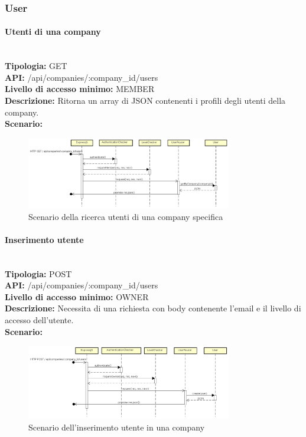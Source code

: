 \newpage
\subsubsection{User}
\paragraph{Utenti di una company}\mbox{}\\
\textbf{Tipologia:} GET \\
\textbf{API:} /api/companies/:company\_id/users \\
\textbf{Livello di accesso minimo:} MEMBER \\
\textbf{Descrizione:} Ritorna un array di JSON contenenti i profili degli utenti della company. \\
\textbf{Scenario:} 
\begin{figure}[H]
\centering
\includegraphics[width=0.8\textwidth]{res/sections/backend/sequence/(GET)user.png}
\caption{Scenario della ricerca utenti di una company specifica}
\end{figure}

\newpage
\paragraph{Inserimento utente}\mbox{}\\
\textbf{Tipologia:} POST \\
\textbf{API:} /api/companies/:company\_id/users \\
\textbf{Livello di accesso minimo:} OWNER \\
\textbf{Descrizione:} Necessita di una richiesta con body contenente l'email e il livello di accesso dell'utente.\\
\textbf{Scenario:} 
\begin{figure}[H]
\centering
\includegraphics[width=0.8\textwidth]{res/sections/backend/sequence/(POST)user.png}
\caption{Scenario dell'inserimento utente in una company}
\end{figure}

